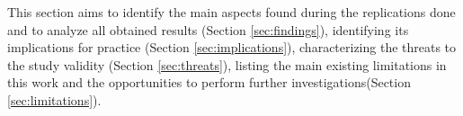 This section aims to identify the main aspects found during the replications done and to analyze all obtained results (Section \ref{sec:findings}), identifying its implications for practice (Section \ref{sec:implications}), characterizing the threats to the study validity (Section \ref{sec:threats}), listing the main existing limitations in this work and the opportunities to perform further investigations(Section \ref{sec:limitations}).